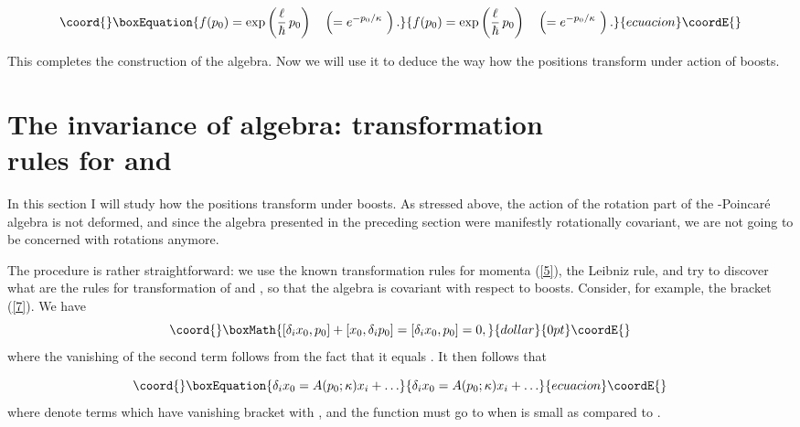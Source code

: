 \documentclass[a4paper,a4paper]{article}
\begin{document}
\begin{equation}\coord{}\boxEquation{\label{9}
   f(p_0) = \exp\left(\frac\ell\hbar\, p_0 \right) \quad \left( = e^{-p_0/\kappa} \,\, \right). 
}{f(p_0) = \exp\left(\frac\ell\hbar\, p_0 \right) \quad \left( = e^{-p_0/\kappa} \,\, \right). 
}{ecuacion}\coordE{}\end{equation}

This completes the construction of the algebra. Now we will use it to deduce the way how the positions \coordHE{} transform under action of boosts.



\section{The invariance of algebra: transformation\\ rules for \coordHE{} and \coordHE{}}

In this section I will study how the   positions transform under boosts. As  stressed above, the action of the rotation part of the \myHighlight{$\kappa$}\coordHE{}-Poincar\'e algebra is not deformed, and since the  algebra presented in the preceding section were manifestly rotationally covariant, we are not going to be concerned with rotations anymore.

The procedure is rather straightforward: we use the known transformation rules for momenta (\ref{5}), the Leibniz rule, and try to discover what are the rules for transformation of \coordHE{} and \coordHE{}, so that the algebra is covariant with respect to boosts. Consider, for example, the bracket (\ref{7}). We have
$$\coord{}\boxMath{ [\delta_i x_0, p_0] + [x_0, \delta_i p_0] = [\delta_i x_0, p_0] =0,}{dollar}{0pt}\coordE{}$$
where the vanishing of the second term follows from the fact that it  equals  \myHighlight{$[x_0,p_i]$}\coordHE{}. It  then follows that

\begin{equation}\coord{}\boxEquation{\label{10}
  \delta_i x_0 = A(p_0;\kappa) x_i + \ldots
}{\delta_i x_0 = A(p_0;\kappa) x_i + \ldots
}{ecuacion}\coordE{}\end{equation}
where \myHighlight{$\ldots$}\coordHE{} denote terms which have vanishing bracket with \coordHE{}, and the function \coordHE{} must go to \coordHE{} when \coordHE{} is small as compared to \myHighlight{$\kappa$}\coordHE{}. 
\end{document}
